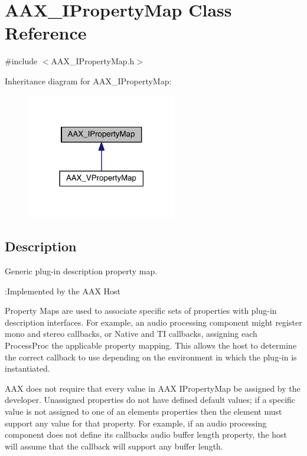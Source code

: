 \hypertarget{a00112}{}\section{A\+A\+X\+\_\+\+I\+Property\+Map Class Reference}
\label{a00112}


{\ttfamily \#include $<$A\+A\+X\+\_\+\+I\+Property\+Map.\+h$>$}



Inheritance diagram for A\+A\+X\+\_\+\+I\+Property\+Map\+:
\nopagebreak
\begin{figure}[H]
\begin{center}
\leavevmode
\includegraphics[width=186pt]{a00657}
\end{center}
\end{figure}


\subsection{Description}
Generic plug-\/in description property map. 

\begin{DoxyRefDesc}{\+:\+Implemented by the A\+A\+X Host}
\item[\hyperlink{a00001__aax_host_implementation000011}{\+:\+Implemented by the A\+A\+X Host}]\end{DoxyRefDesc}


Property Maps are used to associate specific sets of properties with plug-\/in description interfaces. For example, an audio processing component might register mono and stereo callbacks, or Native and T\+I callbacks, assigning each {\ttfamily Process\+Proc} the applicable property mapping. This allows the host to determine the correct callback to use depending on the environment in which the plug-\/in is instantiated.

A\+A\+X does not require that every value in A\+A\+X I\+Property\+Map be assigned by the developer. Unassigned properties do not have defined default values; if a specific value is not assigned to one of an element\textquotesingle{}s properties then the element must support any value for that property. For example, if an audio processing component does not define its callback\textquotesingle{}s audio buffer length property, the host will assume that the callback will support any buffer length.


